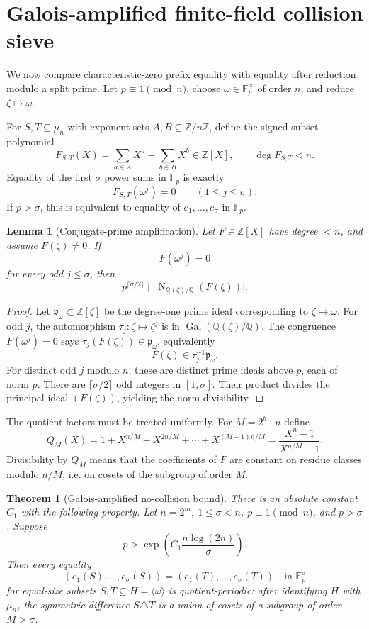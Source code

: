 \documentclass[11pt]{article}
\newtheorem{theorem}{Theorem}[section]
\newtheorem{lemma}[lemma]{Lemma}
\theoremstyle{definition}
\newcommand{\F}{\mathbb F}
\newcommand{\Z}{\mathbb Z}
\newcommand{\Q}{\mathbb Q}
\newcommand{\Norm}{\operatorname{N}}
\begin{document}
\section{Galois-amplified finite-field collision sieve}\label{sec:galois}

We now compare characteristic-zero prefix equality with equality after reduction modulo a split prime.  Let $p\equiv1\pmod n$, choose $\omega\in\F_p^\times$ of order $n$, and reduce $\zeta\mapsto\omega$.

For $S,T\subseteq\mu_n$ with exponent sets $A,B\subseteq\Z/n\Z$, define the signed subset polynomial
\[
        F_{S,T}(X)=\sum_{a\in A}X^a-\sum_{b\in B}X^b\in\Z[X],
        \qquad \deg F_{S,T}<n.
\]
Equality of the first $\sigma$ power sums in $\F_p$ is exactly
\[
        F_{S,T}(\omega^j)=0\qquad(1\le j\le\sigma).
\]
If $p>\sigma$, this is equivalent to equality of $e_1,\ldots,e_\sigma$ in $\F_p$.

\begin{lemma}[Conjugate-prime amplification]\label{lem:galois-amp}
Let $F\in\Z[X]$ have degree $<n$, and assume $F(\zeta)\ne0$.  If
\[
        F(\omega^j)=0
\]
for every odd $j\le\sigma$, then
\[
        p^{\lceil\sigma/2\rceil}\mid \big|\Norm_{\Q(\zeta)/\Q}(F(\zeta))\big|.
\]
\end{lemma}

\begin{proof}
Let $\mathfrak p_\omega\subset\Z[\zeta]$ be the degree-one prime ideal corresponding to $\zeta\mapsto\omega$.  For odd $j$, the automorphism $\tau_j:\zeta\mapsto\zeta^j$ is in $\operatorname{Gal}(\Q(\zeta)/\Q)$.  The congruence $F(\omega^j)=0$ says $\tau_j(F(\zeta))\in\mathfrak p_\omega$, equivalently
\[
        F(\zeta)\in\tau_j^{-1}\mathfrak p_\omega.
\]
For distinct odd $j$ modulo $n$, these are distinct prime ideals above $p$, each of norm $p$.  There are $\lceil\sigma/2\rceil$ odd integers in $[1,\sigma]$.  Their product divides the principal ideal $(F(\zeta))$, yielding the norm divisibility.
\end{proof}

The quotient factors must be treated uniformly.  For $M=2^b\mid n$ define
\[
        Q_M(X)=1+X^{n/M}+X^{2n/M}+\cdots+X^{(M-1)n/M}=\frac{X^n-1}{X^{n/M}-1}.
\]
Divisibility by $Q_M$ means that the coefficients of $F$ are constant on residue classes modulo $n/M$, i.e. on cosets of the subgroup of order $M$.

\begin{theorem}[Galois-amplified no-collision bound]\label{thm:no-collision}
There is an absolute constant $C_1$ with the following property.  Let $n=2^m$, $1\le\sigma<n$, $p\equiv1\pmod n$, and $p>\sigma$.  Suppose
\[
        p>\exp\!\left(C_1\frac{n\log(2n)}{\sigma}\right).
\]
Then every equality
\[
        (e_1(S),\ldots,e_\sigma(S))=(e_1(T),\ldots,e_\sigma(T))\quad\text{in }\F_p^\sigma
\]
for equal-size subsets $S,T\subseteq H=\langle\omega\rangle$ is quotient-periodic: after identifying $H$ with $\mu_n$, the symmetric difference $S\triangle T$ is a union of cosets of a subgroup of order $M>\sigma$.
\end{theorem}
\end{document}
